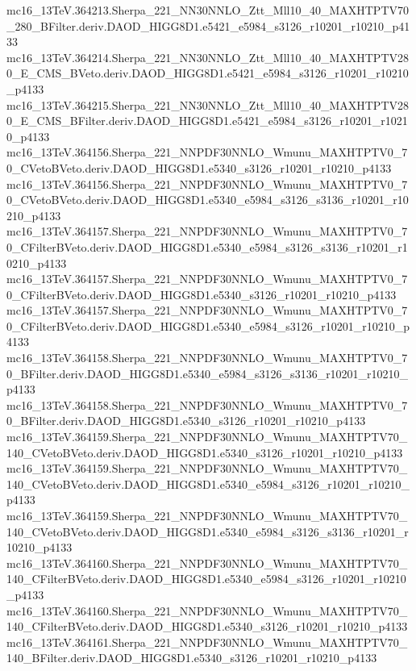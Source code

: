 mc16_13TeV.364213.Sherpa_221_NN30NNLO_Ztt_Mll10_40_MAXHTPTV70_280_BFilter.deriv.DAOD_HIGG8D1.e5421_e5984_s3126_r10201_r10210_p4133 \\
mc16_13TeV.364214.Sherpa_221_NN30NNLO_Ztt_Mll10_40_MAXHTPTV280_E_CMS_BVeto.deriv.DAOD_HIGG8D1.e5421_e5984_s3126_r10201_r10210_p4133 \\
mc16_13TeV.364215.Sherpa_221_NN30NNLO_Ztt_Mll10_40_MAXHTPTV280_E_CMS_BFilter.deriv.DAOD_HIGG8D1.e5421_e5984_s3126_r10201_r10210_p4133 \\
mc16_13TeV.364156.Sherpa_221_NNPDF30NNLO_Wmunu_MAXHTPTV0_70_CVetoBVeto.deriv.DAOD_HIGG8D1.e5340_s3126_r10201_r10210_p4133 \\
mc16_13TeV.364156.Sherpa_221_NNPDF30NNLO_Wmunu_MAXHTPTV0_70_CVetoBVeto.deriv.DAOD_HIGG8D1.e5340_e5984_s3126_s3136_r10201_r10210_p4133 \\
mc16_13TeV.364157.Sherpa_221_NNPDF30NNLO_Wmunu_MAXHTPTV0_70_CFilterBVeto.deriv.DAOD_HIGG8D1.e5340_e5984_s3126_s3136_r10201_r10210_p4133 \\
mc16_13TeV.364157.Sherpa_221_NNPDF30NNLO_Wmunu_MAXHTPTV0_70_CFilterBVeto.deriv.DAOD_HIGG8D1.e5340_s3126_r10201_r10210_p4133 \\
mc16_13TeV.364157.Sherpa_221_NNPDF30NNLO_Wmunu_MAXHTPTV0_70_CFilterBVeto.deriv.DAOD_HIGG8D1.e5340_e5984_s3126_r10201_r10210_p4133 \\
mc16_13TeV.364158.Sherpa_221_NNPDF30NNLO_Wmunu_MAXHTPTV0_70_BFilter.deriv.DAOD_HIGG8D1.e5340_e5984_s3126_s3136_r10201_r10210_p4133 \\
mc16_13TeV.364158.Sherpa_221_NNPDF30NNLO_Wmunu_MAXHTPTV0_70_BFilter.deriv.DAOD_HIGG8D1.e5340_s3126_r10201_r10210_p4133 \\
mc16_13TeV.364159.Sherpa_221_NNPDF30NNLO_Wmunu_MAXHTPTV70_140_CVetoBVeto.deriv.DAOD_HIGG8D1.e5340_s3126_r10201_r10210_p4133 \\
mc16_13TeV.364159.Sherpa_221_NNPDF30NNLO_Wmunu_MAXHTPTV70_140_CVetoBVeto.deriv.DAOD_HIGG8D1.e5340_e5984_s3126_r10201_r10210_p4133 \\
mc16_13TeV.364159.Sherpa_221_NNPDF30NNLO_Wmunu_MAXHTPTV70_140_CVetoBVeto.deriv.DAOD_HIGG8D1.e5340_e5984_s3126_s3136_r10201_r10210_p4133 \\
mc16_13TeV.364160.Sherpa_221_NNPDF30NNLO_Wmunu_MAXHTPTV70_140_CFilterBVeto.deriv.DAOD_HIGG8D1.e5340_e5984_s3126_r10201_r10210_p4133 \\
mc16_13TeV.364160.Sherpa_221_NNPDF30NNLO_Wmunu_MAXHTPTV70_140_CFilterBVeto.deriv.DAOD_HIGG8D1.e5340_s3126_r10201_r10210_p4133 \\
mc16_13TeV.364161.Sherpa_221_NNPDF30NNLO_Wmunu_MAXHTPTV70_140_BFilter.deriv.DAOD_HIGG8D1.e5340_s3126_r10201_r10210_p4133 \\
